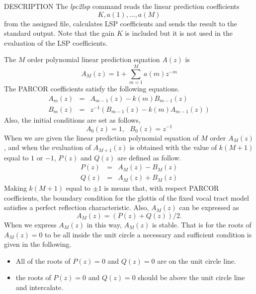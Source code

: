 \begin{qsection}{DESCRIPTION}
The {\em lpc2lsp} command reads the linear prediction coefficients
\begin{displaymath}
  K, a(1), \ldots, a(M)
\end{displaymath}
from the assigned file, calculates LSP coefficients and
sends the result to the standard output.
Note that the gain $K$ is included but it is not used
in the evaluation of the LSP coefficients.
\par
The $M$ order polynomial linear prediction equation $A(z)$ is
\begin{displaymath}
  A_M(z) = 1 + \sum_{m=1}^M a(m) z^{-m}
\end{displaymath}
The PARCOR coefficients satisfy the following equations.
\begin{eqnarray*}
  A_m(z) &=& A_{m-1}(z) - k(m) B_{m-1}(z) \\
  B_m(z) &=& z^{-1} (B_{m-1}(z) - k(m) A_{m-1}(z))
\end{eqnarray*}
Also, the initial conditions are set as follows,
\begin{displaymath}
  A_0(z) = 1,~~~B_0(z) = z^{-1}
\end{displaymath}
When we are given the linear prediction polynomial equation
of $M$ order $A_M(z)$, and when the evaluation of $A_{M+1}(z)$
is obtained with the value of $k(M+1)$ equal to $1$ or $-1$, 
$P(z)$ and $Q(z)$ are defined as follow.
\begin{eqnarray*}
  P(z) &=& A_M(z) - B_M(z) \\
  Q(z) &=& A_M(z) + B_M(z)
\end{eqnarray*}
Making $k(M+1)$ equal to $\pm 1$ is means that,
with respect PARCOR coefficients,
the boundary condition for the glottis of the fixed vocal tract model
satisfies a perfect reflection characteristic.
Also, $A_M(z)$ can be expressed as
\begin{displaymath}
  A_M(z) = ( P(z) + Q(z) ) / 2.
\end{displaymath}
When we express $A_M(z)$ in this way,
$A_M(z)$ is stable.
That is for the roots of $A_M(z)=0$ to be all inside
the unit circle a necessary and sufficient condition is given
in the following.
\begin{itemize}
\item All of the roots of $P(z)=0$ and $Q(z)=0$ are on the unit circle
      line.
\item the roots of $P(z)=0$ and $Q(z)=0$ should be above the unit
      circle line and intercalate.
\end{itemize}

\end{qsection}
